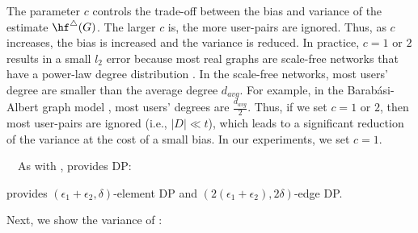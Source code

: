 The parameter $c$ controls the trade-off between the bias and variance of the estimate $\hf^\triangle(G)$. 
The larger $c$ is, the more user-pairs are ignored. 
Thus, as $c$ increases, the bias is increased and the variance is reduced. 
In practice, $c=1$ or $2$ results in a small $l_2$ error %
because most real graphs are scale-free networks that have a power-law degree distribution \cite{NetworkScience}. 
In the scale-free networks, most users' degree are smaller than the average degree $d_{avg}$. 
For example, in the Barab\'{a}si-Albert graph model \cite{NetworkScience,Hagberg_SciPy08}, 
most users' degrees are $\frac{d_{avg}}{2}$. 
Thus, if we set 
$c=1$ or $2$, 
then most user-pairs are ignored (i.e., $|D| \ll t$), which leads to a significant reduction of the variance at the cost of a small bias. 
In our experiments, we set $c=1$. 

\smallskip
{}~~As with \AlgWSTri{}, \AlgWSTriVR{} provides DP: 

\begin{theorem}
\label{thm:DP_II_ast}
\AlgWSTri{} provides $(\epsilon_1 + \epsilon_2, \delta)$-element DP and $(2(\epsilon_1 + \epsilon_2), 2\delta)$-edge DP. 
\end{theorem}


Next, we show the variance of \AlgWSTriVR{}:

